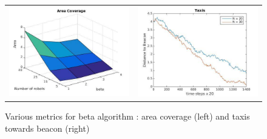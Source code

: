 \documentclass[a4paper, 10pt, conference]{ieeeconf}
\begin{document}
  \begin{figure}[!htbp]
    \begin{center}
      \begin{tabular}{lr}
        \includegraphics[width=6cm]{figures/ac.jpg}   &
        \includegraphics[width=6cm]{figures/taxis.jpg}  \\
      \end{tabular}
      \caption{Various metrics for beta algorithm : area coverage (left) and taxis towards beacon (right)}
      \label{fig:metrics}
    \end{center}
  \end{figure}
\end{document}
